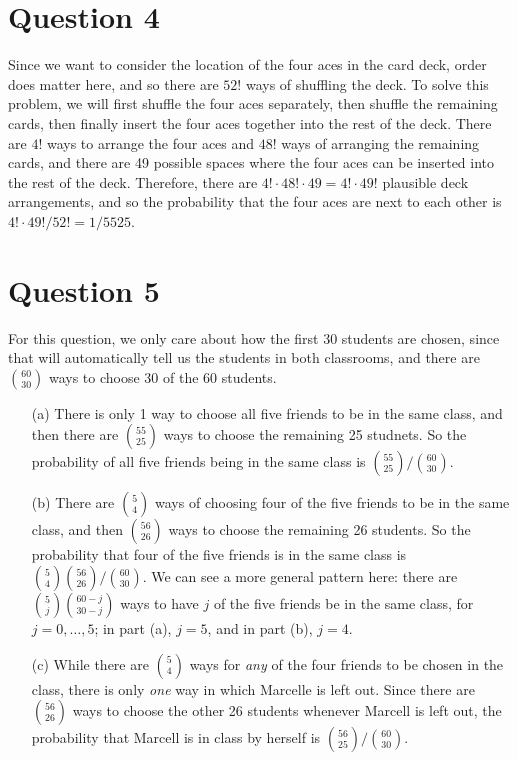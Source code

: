 \documentclass[10pt]{article}
\begin{document}
\section{Question 4} \noindent
Since we want to consider the location of the four aces in the card deck, order does matter here, and so there are \(52!\) ways of shuffling the deck. 
To solve this problem, we will first shuffle the four aces separately, then shuffle the remaining cards, then finally insert the four aces together into the
rest of the deck. There are \(4!\) ways to arrange the four aces and \(48!\) ways of arranging the remaining cards, and there are 49 possible spaces 
where the four aces can be inserted into the rest of the deck. Therefore, there are \(4!\cdot48!\cdot49 = 4!\cdot49!\) plausible deck arrangements, and so the probability
that the four aces are next to each other is \(4!\cdot49! / 52! = 1 / 5525\). 

\section{Question 5} \noindent
For this question, we only care about how the first 30 students are chosen, since that will automatically tell us the students in both classrooms, and there 
are \(\binom{60}{30}\) ways to choose 30 of the 60 students. 
\begin{itemize}
    \item[(a)] There is only 1 way to choose all five friends to be in the same class, and then there are \(\binom{55}{25}\) ways to choose the remaining 
    25 studnets. So the probability of all five friends being in the same class is \(\binom{55}{25} / \binom{60}{30}\).
    \item[(b)] There are \(\binom{5}{4}\) ways of choosing four of the five friends to be in the same class, and then \(\binom{56}{26}\) ways to choose the 
    remaining 26 students. So the probability that four of the five friends is in the same class is \(\binom{5}{4}\binom{56}{26} / \binom{60}{30}\). We can 
    see a more general pattern here: there are \(\binom{5}{j} \binom{60 - j}{30 - j}\) ways to have \(j\) of the five friends be in the same class, for 
    \(j = 0, \ldots,5\); in part (a), \(j = 5\), and in part (b), \(j=4\). 
    \item[(c)] While there are \(\binom{5}{4}\) ways for \textit{any} of the four friends to be chosen in the class, there is only \textit{one} way in which 
    Marcelle is left out. Since there are \(\binom{56}{26}\) ways to choose the other 26 students whenever Marcell is left out, the probability that Marcell 
    is in class by herself is \(\binom{56}{25} / \binom{60}{30}.\)
\end{itemize}
\end{document}
